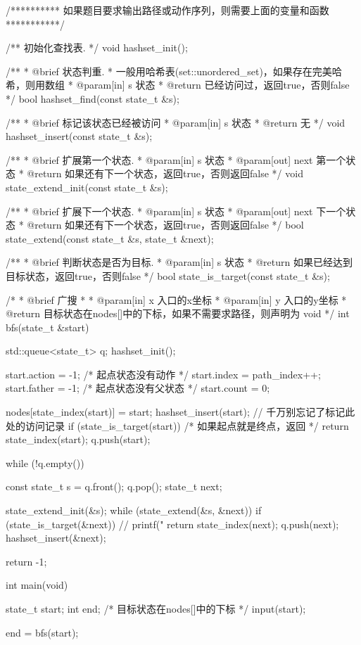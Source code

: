 \begin{Codex}[label=bfs_template2.cpp]
/********** 如果题目要求输出路径或动作序列，则需要上面的变量和函数 ***********/

/** 初始化查找表. */
void hashset_init();

/**
 * @brief 状态判重.
 * 一般用哈希表(set::unordered_set)，如果存在完美哈希，则用数组
 * @param[in] s 状态
 * @return 已经访问过，返回true，否则false
 */
bool hashset_find(const state_t &s);

/**
 * @brief 标记该状态已经被访问
 * @param[in] s 状态
 * @return 无
 */
void hashset_insert(const state_t &s);

/**
 * @brief 扩展第一个状态.
 * @param[in] s 状态
 * @param[out] next 第一个状态
 * @return 如果还有下一个状态，返回true，否则返回false
 */
void state_extend_init(const state_t &s);

/**
 * @brief 扩展下一个状态.
 * @param[in] s 状态
 * @param[out] next 下一个状态
 * @return 如果还有下一个状态，返回true，否则返回false
 */
bool state_extend(const state_t &s, state_t &next);

/**
 * @brief 判断状态是否为目标.
 * @param[in] s 状态
 * @return 如果已经达到目标状态，返回true，否则false
 */
bool state_is_target(const state_t &s);

/*
 * @brief 广搜
 *
 * @param[in] x 入口的x坐标
 * @param[in] y 入口的y坐标
 * @return 目标状态在nodes[]中的下标，如果不需要求路径，则声明为 void
 */
int bfs(state_t &start) {
    std::queue<state_t> q;
    hashset_init();

    start.action = -1;   /* 起点状态没有动作 */
    start.index = path_index++;
    start.father = -1;   /* 起点状态没有父状态 */
    start.count = 0;

    nodes[state_index(start)] = start;
    hashset_insert(start); // 千万别忘记了标记此处的访问记录
    if (state_is_target(start)) /* 如果起点就是终点，返回 */
        return state_index(start);
    q.push(start);

    while (!q.empty()) {
        const state_t s = q.front(); q.pop();
        state_t next;

        state_extend_init(&s);
        while (state_extend(&s, &next)) {
            if (state_is_target(&next)) {
                // printf("%
                return state_index(next);
            }
            q.push(next);
            hashset_insert(&next);
        }
    }
    return -1;
}

int main(void) {
    state_t start;
    int end; /* 目标状态在nodes[]中的下标 */
    input(start);

    end = bfs(start);

}
\end{Codex}
